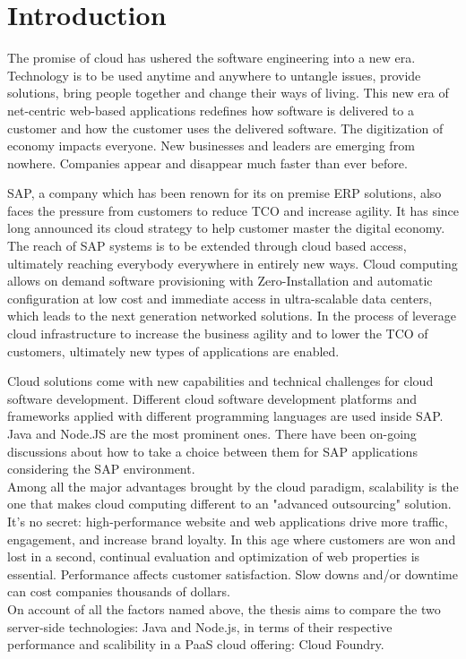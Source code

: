\chapter{Introduction}
The promise of cloud has ushered the software engineering into a new era. Technology is to be used anytime and anywhere to untangle issues, provide solutions, bring people together and change their ways of living. This new era of net-centric web-based applications redefines how software is delivered to a customer and how the customer uses the delivered software. The digitization of economy impacts everyone. New businesses and leaders are emerging from nowhere. Companies appear and disappear much faster than ever before. 

SAP, a company which has been renown for its on premise ERP solutions, also faces the pressure from customers to reduce \ac{TCO} and increase agility. It has since long announced its cloud strategy to help customer master the digital economy. The reach of SAP systems is to be extended through cloud based access, ultimately reaching everybody everywhere in entirely new ways. Cloud computing allows on demand software provisioning with Zero-Installation and automatic configuration at low cost and immediate access in ultra-scalable data centers, which leads to the next generation networked solutions. In the process of leverage cloud infrastructure to increase the business agility and to lower the TCO of customers, ultimately new types of applications are enabled.

Cloud solutions come with new capabilities and technical challenges for cloud software development. Different cloud software development platforms and frameworks applied with different programming languages are used inside SAP. Java and Node.JS are the most prominent ones. There have been on-going discussions about how to  take a choice between them for SAP applications considering the SAP environment.\\
Among all the major advantages brought by the cloud paradigm, scalability is the one that makes cloud computing different to an "advanced outsourcing" solution. It’s no secret: high-performance website and web applications drive more traffic, engagement, and increase brand loyalty. In this age where customers are won and lost in a second, continual evaluation and optimization of web properties is essential.  Performance affects customer satisfaction. Slow downs and/or downtime can cost companies thousands of dollars.\\
On account of all the factors named above,  the thesis aims to compare the two server-side technologies: Java and Node.js, in terms of their respective performance and scalibility in a PaaS cloud offering: Cloud Foundry.






